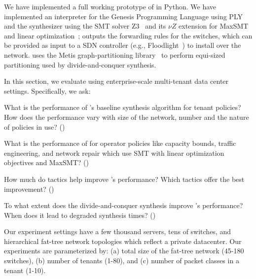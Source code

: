  We have implemented a full working
prototype of \Name in Python. We have implemented an interpreter for
the Genesis Programming Language using PLY~\cite{ply} and the synthesizer using 
the SMT solver Z3~\cite{z3} and its $\nu Z$ extension for MaxSMT and linear
 optimization~\cite{nuz3}; \name outputs the
forwarding rules for the switches, which can be provided as input to a
SDN controller (e.g., Floodlight~\cite{floodlight}) to install over the
network. \Name uses the Metis graph-partitioning library~\cite{metis}
to perform equi-sized partitioning 
used by divide-and-conquer synthesis. 

In this section, we evaluate \Name using
enterprise-scale multi-tenant data
center settings. 
Specifically, we ask:
\begin{compactitemize}
\item What is the performance of \Name's baseline synthesis
  algorithm for tenant policies? How does the performance vary with size of the
  network, number and the nature of policies in use? ()
  
  \item What is the performance of \name for operator policies
  like capacity bounds, traffic engineering, and network repair
  which use SMT with linear optimization objectives and MaxSMT? ()

\item How much do tactics help improve \Name's 
  performance? Which tactics offer the best improvement? ()

\item To what extent does the divide-and-conquer synthesis improve \Name's
  performance? When does it lead to degraded synthesis times? ()

\end{compactitemize}
Our experiment settings have a few thousand servers, tens of switches,
and hierarchical fat-tree network topologies which reflect a private
datacenter. Our experiments are parameterized by: (a) total size of
the fat-tree network (45-180 switches), (b) number of
tenants (1-80), and (c) number of packet classes in a tenant (1-10).

